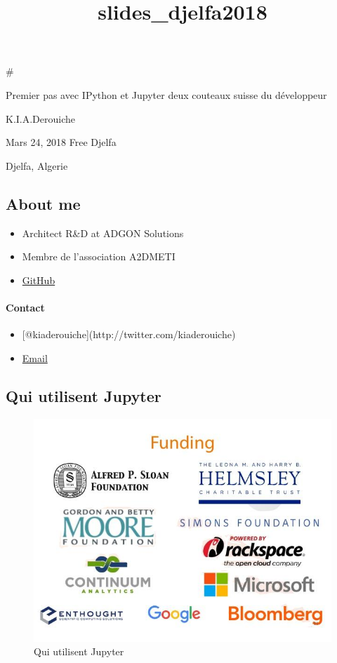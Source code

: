 \documentclass[11pt]{article}
\title{slides\_djelfa2018}
\makeatletter
\def\maxwidth{\ifdim\Gin@nat@width>\linewidth\linewidth
    \else\Gin@nat@width\fi}
\let\Oldincludegraphics\includegraphics
\renewcommand{\includegraphics}[1]{\Oldincludegraphics[width=.8\maxwidth]{#1}}
\providecommand{\tightlist}{%
      \setlength{\itemsep}{0pt}\setlength{\parskip}{0pt}}
\makeatother
\begin{document}
    
    
    \maketitle
    
    

    
    \#

Premier pas avec IPython et Jupyter deux couteaux suisse du développeur

K.I.A.Derouiche

Mars 24, 2018 Free Djelfa

Djelfa, Algerie

    \subsection{About me}\label{about-me}

\begin{itemize}
\tightlist
\item
  Architect R\&D at ADGON Solutions
\item
  Membre de l'association A2DMETI
\item
  \href{http://github.com/kiaderouiche}{GitHub}
\end{itemize}

\paragraph{Contact}\label{contact}

\begin{itemize}
\tightlist
\item
  {[}@kiaderouiche{]}(http://twitter.com/kiaderouiche)
\item
  \href{mailto:kamel.derouiche@gmail.com}{Email}
\end{itemize}

    \subsection{Qui utilisent Jupyter}\label{qui-utilisent-jupyter}

\begin{figure}
\centering
\includegraphics{images/jupyter-a-platform-use.jpg}
\caption{Qui utilisent Jupyter}
\end{figure}
\end{document}
